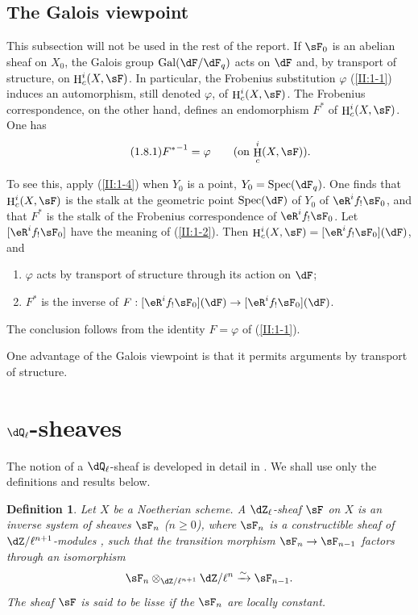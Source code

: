 \documentclass[12pt,oneside,english]{smfbook}
\DeclareMathOperator{\gal}{Gal}
\DeclareMathOperator{\h}{H}
\DeclareMathOperator{\spec}{Spec}
\newcommand{\iso}{\xrightarrow\sim}
\newtheorem{definition_}[subsection]{Definition}
\begin{document}
\subsection{The Galois viewpoint}\label{II:1-8}

This subsection will not be used in the rest of the report. If $\sF_0$ is an abelian sheaf on $X_0$, the Galois group $\gal(\dF/\dF_q)$ acts on $\dF$ and, by transport of structure, on $\h_c^i(X,\sF)$. In particular, the Frobenius substitution $\varphi$ (\ref{II:1-1}) induces an automorphism, still denoted $\varphi$, of $\h_c^i(X,\sF)$. The Frobenius correspondence, on the other hand, defines an endomorphism $F^*$ of $\h_c^i(X,\sF)$. One has
\begin{equation*}\tag{1.8.1}\label{II:eq:1-8-1}
  {F^*}^{-1} = \varphi \qquad \text{(on $\h_c^i(X,\sF)$).}
\end{equation*}

To see this, apply (\ref{II:1-4}) when $Y_0$ is a point, $Y_0=\spec(\dF_q)$. One finds that $\h_c^i(X,\sF)$ is the stalk at the geometric point $\spec(\dF)$ of $Y_0$ of $\eR^if_!\sF_0$, and that $F^*$ is the stalk of the Frobenius correspondence of $\eR^if_!\sF_0$. Let $[\eR^if_!\sF_0]$ have the meaning of (\ref{II:1-2}). Then $\h_c^i(X,\sF) = [\eR^i f_!\sF_0](\dF)$, and
\begin{enumerate}[\indent a)]
  \item $\varphi$ acts by transport of structure through its action on $\dF$;
  \item $F^*$ is the inverse of $F:[\eR^i f_!\sF_0](\dF) \to [\eR^i f_!\sF_0](\dF)$.
\end{enumerate}

The conclusion follows from the identity $F=\varphi$ of (\ref{II:1-1}).

One advantage of the Galois viewpoint is that it permits arguments by transport of structure.

\section{\texorpdfstring{$\dQ_\ell$}{Ql}-sheaves}\label{II:2}

The notion of a $\dQ_\ell$-sheaf is developed in detail in \cite[V,VI]{sga5}. We shall use only the definitions and results below.

\begin{definition_}\label{II:2-1}
Let $X$ be a Noetherian scheme. A $\dZ_\ell$-sheaf $\sF$ on $X$ is an inverse system of sheaves $\sF_n$ ($n\geqslant0$), where $\sF_n$ is a constructible sheaf of $\dZ/\ell^{n+1}$-modules \cite[IX.2]{sga4}, such that the transition morphism $\sF_n\to\sF_{n-1}$ factors through an isomorphism
\[
  \sF_n\otimes_{\dZ/\ell^{n+1}} \dZ/\ell^n \iso \sF_{n-1}\text{.}
\]
The sheaf $\sF$ is said to be \emph{lisse} if the $\sF_n$ are locally constant.
\end{definition_}
\end{document}
